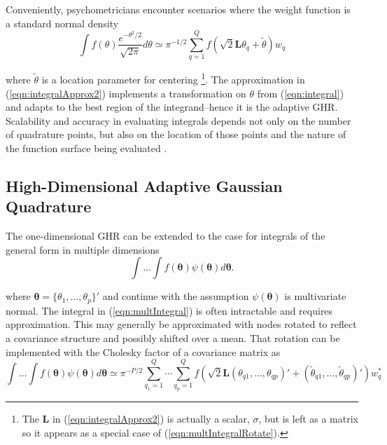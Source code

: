 \documentclass[12pt]{article}
\begin{document}
Conveniently, psychometricians encounter scenarios where the weight function is a standard normal density
\begin{equation}
\label{eqn:integralApprox2}
\int f(\theta)\frac{e^{-\theta^2/2}}{\sqrt{2\pi}} d\theta \simeq \pi^{-1/2}\sum_{q=1}^Q f(\sqrt{2}\bm{L}\theta_q+\widetilde{\theta})w_q
\end{equation}

\noindent where $\widetilde{\theta}$ is a location parameter for centering \cite{liu:pierce}\footnote{The $\bm{L}$ in (\ref{eqn:integralApprox2}) is actually a scalar, $\sigma$, but is left as a matrix so it appears as a special case of (\ref{eqn:multIntegralRotate}).}. The approximation in (\ref{eqn:integralApprox2}) implements a transformation on $\theta$ from (\ref{eqn:integral}) and adapts to the best region of the integrand--hence it is the adaptive GHR. Scalability and accuracy in evaluating integrals depends not only on the number of quadrature points, but also on the location of those points and the nature of the function surface being evaluated \cite{Lesaffre}. 

\subsection*{High-Dimensional Adaptive Gaussian Quadrature}

The one-dimensional GHR can be extended to the case for integrals of the general form in multiple dimensions 
\begin{equation}
\label{eqn:multIntegral}
\int \ldots \int f(\bm{\theta}) \psi(\bm{\theta}) d\bm{\theta}.
\end{equation}

\noindent where $\bm{\theta} = \{\theta_{1}, \ldots, \theta_{p}\}'$ and continue with the assumption $\psi(\bm{\theta})$ is multivariate normal. The integral in (\ref{eqn:multIntegral}) is often intractable and requires approximation. This may generally be approximated with nodes rotated to reflect a covariance structure and possibly shifted over a mean. That rotation can be implemented with the Cholesky factor of a covariance matrix as \cite{chowdhary,jackel,judd,stringer} 
\begin{equation}
\label{eqn:multIntegralRotate}
\int \ldots \int f(\bm{\theta})\psi(\bm{\theta}) d\bm{\theta}  \simeq  \pi^{-P/2}\sum_{q_1=1}^{Q} \cdots \sum_{q_p=1}^{Q} f(\sqrt{2}\bm{L}(\theta_{q1}, \ldots, \theta_{qp})' + (\widetilde{\theta}_{q1}, \ldots, \widetilde{\theta}_{qp})')w_q^*
\end{equation}
 
\end{document}

